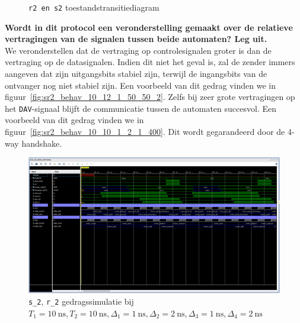 \documentclass[titlepage]{article}
\begin{document}
\begin{figure}[h!]
    \caption{\texttt{r2 en s2} toestandstransitiediagram}
    \label{fig:rs2_toestandstransitiediagram}
\end{figure}

\clearpage

\noindent \textbf{Wordt in dit protocol een veronderstelling gemaakt over de relatieve vertragingen van de signalen tussen beide automaten? Leg uit.} \\
We veronderstellen dat de vertraging op controlesignalen groter is dan de vertraging op de datasignalen.
Indien dit niet het geval is, zal de zender immers aangeven dat zijn uitgangsbits stabiel zijn, terwijl de ingangsbits van de ontvanger nog niet stabiel zijn.
Een voorbeeld van dit gedrag vinden we in figuur~\ref{fig:sr2_behav_10_12_1_50_50_2}.
Zelfs bij zeer grote vertragingen op het \texttt{DAV}-signaal blijft de communicatie tussen de automaten succesvol.
Een voorbeeld van dit gedrag vinden we in figuur~\ref{fig:sr2_behav_10_10_1_2_1_400}.
Dit wordt gegarandeerd door de 4-way handshake.

\begin{figure}[htpb]
    \centering
    \includegraphics[trim={0 375px 0 0}, clip, width =\linewidth]{sr2_gedragssimulatie_10_10_1_2_1_2.PNG}
    \caption{\texttt{s\_2}, \texttt{r\_2} gedragssimulatie bij \(T_1 = \SI{10}{\nano\second}, T_2 = \SI{10}{\nano\second},
    \Delta_1 = \SI{1}{\nano\second}, \Delta_2 = \SI{2}{\nano\second}, \Delta_3 = \SI{1}{\nano\second}, \Delta_4 = \SI{2}{\nano\second} \)}
    \label{fig:sr2_behav_10_10_1_2_1_2}
\end{figure}
\end{document}
